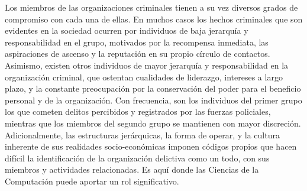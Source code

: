 Los miembros de las organizaciones criminales tienen a su vez diversos grados de compromiso con cada una de ellas. En muchos casos los hechos criminales que son evidentes en la sociedad ocurren por individuos de baja jerarquía y responsabilidad en el grupo, motivados por la recompensa inmediata, las aspiraciones de ascenso y la reputación en su propio círculo de contactos. Asimismo, existen otros individuos de mayor jerarquía y responsabilidad en la organización criminal, que ostentan cualidades de liderazgo, intereses a largo plazo, y la constante preocupación por la conservación del poder para el beneficio personal y de la organización. Con frecuencia, son los individuos del primer grupo los que cometen delitos percibidos y registrados por las fuerzas policiales, mientras que los miembros del segundo grupo se mantienen con mayor discreción. Adicionalmente, las estructuras jerárquicas, la forma de operar, y la cultura inherente de sus realidades socio-económicas  imponen códigos propios que hacen difícil la identificación de la organización delictiva como un todo, con sus miembros y actividades relacionadas. Es aquí donde las Ciencias de la Computación puede aportar un rol significativo.
